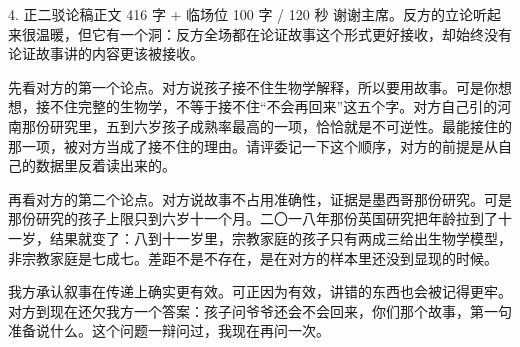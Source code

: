 \documentclass[script,pro]{debate}
\begin{document}
\begin{speech}{4. 正二驳论稿}{正文 416 字 + 临场位 100 字 / 120 秒}
谢谢主席。反方的立论听起来很温暖，但它有一个洞：反方全场都在论证故事这个形式更好接收，却始终没有论证故事讲的内容更该被接收。


先看对方的第一个论点。对方说孩子接不住生物学解释，所以要用故事。可是你想想，接不住完整的生物学，不等于接不住“不会再回来”这五个字。对方自己引的河南那份研究里，五到六岁孩子成熟率最高的一项，恰恰就是不可逆性。最能接住的那一项，被对方当成了接不住的理由。请评委记一下这个顺序，对方的前提是从自己的数据里反着读出来的。

再看对方的第二个论点。对方说故事不占用准确性，证据是墨西哥那份研究。可是那份研究的孩子上限只到六岁十一个月。二〇一八年那份英国研究把年龄拉到了十一岁，结果就变了：八到十一岁里，宗教家庭的孩子只有两成三给出生物学模型，非宗教家庭是七成七。差距不是不存在，是在对方的样本里还没到显现的时候。

我方承认叙事在传递上确实更有效。可正因为有效，讲错的东西也会被记得更牢。对方到现在还欠我方一个答案：孩子问爷爷还会不会回来，你们那个故事，第一句准备说什么。这个问题一辩问过，我现在再问一次。

\begin{contingency}
\end{contingency}
\end{speech}
\end{document}
